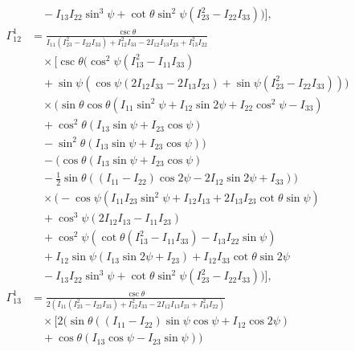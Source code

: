 \documentclass[pdflatex,sn-mathphys-num]{sn-jnl}%
\theoremstyle{thmstyleone}%
\theoremstyle{thmstyletwo}%
\theoremstyle{thmstylethree}%
\begin{document}
\begin{appendices}
\begin{align}
    &\quad -I_{13} I_{22} \sin ^3\psi+\cot \theta \sin ^2\psi \left(I_{23}^2-I_{22} I_{33}\right)\bigg) \bigg], \nonumber \\
    \Gamma^{1}_{12} &= \frac{\csc \theta}{I_{11} \left(I_{23}^2-I_{22} I_{33}\right)+I_{12}^2 I_{33}-2 I_{12} I_{13} I_{23}+I_{13}^2 I_{22}} \nonumber \\
    &\quad \times \bigg[ \csc \theta \Big(\cos ^2\psi \left(I_{13}^2-I_{11} I_{33}\right) \nonumber \\
    &\quad +\sin \psi \left(\cos \psi (2 I_{12} I_{33}-2 I_{13} I_{23})+\sin \psi \left(I_{23}^2-I_{22} I_{33}\right)\right)\Big) \nonumber \\
    &\quad \times \bigg(\sin \theta \cos \theta \left(I_{11} \sin ^2\psi+I_{12} \sin 2\psi+I_{22} \cos ^2\psi-I_{33}\right) \nonumber \\
    &\quad +\cos ^2\theta (I_{13} \sin \psi+I_{23} \cos \psi) \nonumber \\
    &\quad -\sin ^2\theta (I_{13} \sin \psi+I_{23} \cos \psi)\bigg) \nonumber \\
    &\quad -\bigg(\cos \theta (I_{13} \sin \psi+I_{23} \cos \psi) \nonumber \\
    &\quad -\frac{1}{2} \sin \theta ((I_{11}-I_{22}) \cos 2\psi-2 I_{12} \sin 2\psi+I_{33})\bigg) \nonumber \\
    &\quad \times \bigg(-\cos \psi \left(I_{11} I_{23} \sin ^2\psi+I_{12} I_{13}+2 I_{13} I_{23} \cot \theta \sin \psi\right) \nonumber \\
    &\quad +\cos ^3\psi (2 I_{12} I_{13}-I_{11} I_{23}) \nonumber \\
    &\quad +\cos ^2\psi \left(\cot \theta \left(I_{13}^2-I_{11} I_{33}\right)-I_{13} I_{22} \sin \psi\right) \nonumber \\
    &\quad +I_{12} \sin \psi (I_{13} \sin 2\psi+I_{23}) +I_{12} I_{33} \cot \theta \sin 2\psi \nonumber \\
    &\quad -I_{13} I_{22} \sin ^3\psi+\cot \theta \sin ^2\psi \left(I_{23}^2-I_{22} I_{33}\right)\bigg) \bigg], \nonumber \\
    \Gamma^{1}_{13} &= \frac{\csc \theta}{2 \left(I_{11} \left(I_{23}^2-I_{22} I_{33}\right)+I_{12}^2 I_{33}-2 I_{12} I_{13} I_{23}+I_{13}^2 I_{22}\right)} \nonumber \\
    &\quad \times \bigg[ 2 \Big(\sin \theta ((I_{11}-I_{22}) \sin \psi \cos \psi+I_{12} \cos 2\psi) \nonumber \\
    &\quad +\cos \theta (I_{13} \cos \psi-I_{23} \sin \psi)\Big) \nonumber \\

\end{align}
\end{appendices}
\end{document}

